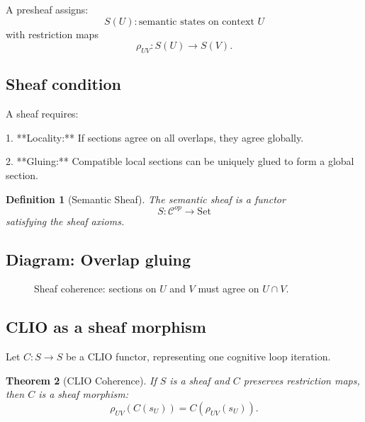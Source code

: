 \documentclass[11pt,a4paper,twocolumn]{article}
\newtheorem{theorem}{Theorem}[section]
\newtheorem{definition}[theorem]{Definition}
\begin{document}
A presheaf assigns:
\[
S(U): \text{semantic states on context } U
\]
with restriction maps
\[
\rho_{UV} : S(U) \to S(V).
\]

\subsection{Sheaf condition}

A sheaf requires:

1. **Locality:** If sections agree on all overlaps, they agree globally.

2. **Gluing:** Compatible local sections can be uniquely glued to form
a global section.

\begin{definition}[Semantic Sheaf]
The semantic sheaf is a functor
\[
S: \mathcal{C}^{op} \to \mathrm{Set}
\]
satisfying the sheaf axioms.
\end{definition}

\subsection{Diagram: Overlap gluing}

\begin{figure}[H]
\centering
{}
\caption{Sheaf coherence: sections on $U$ and $V$ must agree on $U \cap V$.}
\end{figure}

\subsection{CLIO as a sheaf morphism}

Let $C : S \to S$ be a CLIO functor, representing one cognitive loop iteration.

\begin{theorem}[CLIO Coherence]
If $S$ is a sheaf and $C$ preserves restriction maps, then $C$
is a sheaf morphism:
\[
\rho_{UV}(C(s_U)) = C(\rho_{UV}(s_U)).
\]
\end{theorem}
\end{document}
